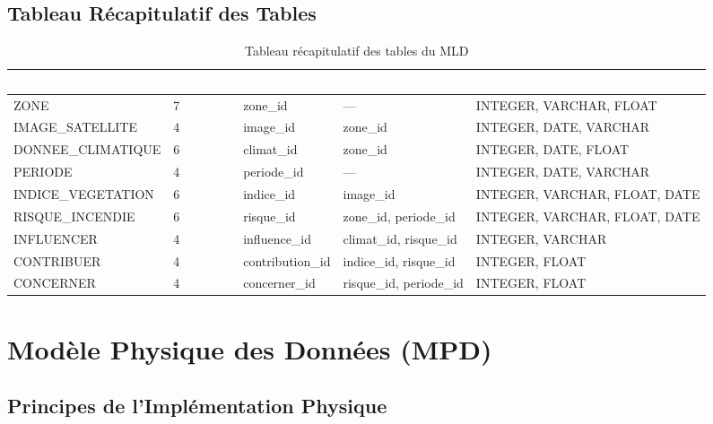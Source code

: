 \documentclass[12pt,a4paper]{report}
\begin{document}
\subsection{Tableau Récapitulatif des Tables}

\begin{table}[H]
\centering
{}
\begin{tabularx}{\textwidth}{L{3.8cm} C{1.5cm} L{2cm} L{3cm} X}
\toprule
{}
\textcolor{white}{\textbf{Table}} &
\textcolor{white}{\textbf{Colonnes}} &
\textcolor{white}{\textbf{PK}} &
\textcolor{white}{\textbf{FK}} &
\textcolor{white}{\textbf{Types principaux}} \\
\midrule
ZONE              & 7 & zone\_id       & ---                    & INTEGER, VARCHAR, FLOAT \\
IMAGE\_SATELLITE  & 4 & image\_id      & zone\_id               & INTEGER, DATE, VARCHAR \\
DONNEE\_CLIMATIQUE & 6 & climat\_id    & zone\_id               & INTEGER, DATE, FLOAT \\
PERIODE           & 4 & periode\_id    & ---                    & INTEGER, DATE, VARCHAR \\
INDICE\_VEGETATION & 6 & indice\_id    & image\_id              & INTEGER, VARCHAR, FLOAT, DATE \\
RISQUE\_INCENDIE  & 6 & risque\_id     & zone\_id, periode\_id  & INTEGER, VARCHAR, FLOAT, DATE \\
INFLUENCER        & 4 & influence\_id  & climat\_id, risque\_id & INTEGER, VARCHAR \\
CONTRIBUER        & 4 & contribution\_id & indice\_id, risque\_id & INTEGER, FLOAT \\
CONCERNER         & 4 & concerner\_id  & risque\_id, periode\_id & INTEGER, FLOAT \\
\bottomrule
\end{tabularx}
\caption{Tableau récapitulatif des tables du MLD}
\label{tab:recap_mld}
\end{table}

\section{Modèle Physique des Données (MPD)}

\subsection{Principes de l'Implémentation Physique}
\end{document}
